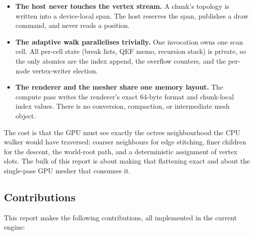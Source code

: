 \begin{itemize}
\item \textbf{The host never touches the vertex stream.}  A chunk's
  topology is written into a device-local span.  The host reserves the
  span, publishes a draw command, and never reads a position.
\item \textbf{The adaptive walk parallelises trivially.}  One invocation
  owns one scan cell.  All per-cell state (break lists, QEF memo, recursion
  stack) is private, so the only atomics are the index append, the overflow
  counters, and the per-node vertex-writer election.
\item \textbf{The renderer and the mesher share one memory layout.}  The
  compute pass writes the renderer's exact 64-byte  format
  and chunk-local index values.  There is no conversion, compaction, or
  intermediate mesh object.
\end{itemize}

The cost is that the GPU must see exactly the octree neighbourhood the CPU
walker would have traversed: coarser neighbours for edge stitching, finer
children for the descent, the world-root path, and a deterministic
assignment of vertex slots.  The bulk of this report is about making that
flattening exact and about the single-pass GPU mesher that consumes it.

\subsection{Contributions}

This report makes the following contributions, all implemented in the
current engine:

